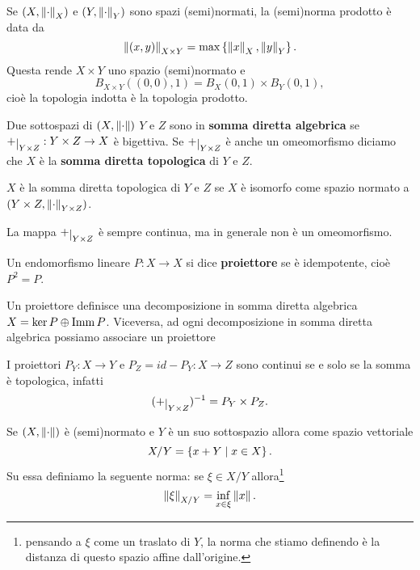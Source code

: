 \begin{definition}
    Se $(X,{\left\Vert{\cdot}\right\Vert}_X)$ e $(Y,{\left\Vert{\cdot}\right\Vert}_Y)$ sono spazi (semi)normati, la (semi)norma prodotto \`e data da
    \[\left\Vert{(x,y)}\right\Vert_{X\times Y}=\max\left\{{\left\Vert{x}\right\Vert_X,\left\Vert{y}\right\Vert_Y}\right\}.\]
    Questa rende $X\times Y$ uno spazio (semi)normato e
    \[B_{X\times Y}((0,0),1)=B_X(0,1)\times B_Y(0,1),\]
    cio\`e la topologia indotta \`e la topologia prodotto.
\end{definition}

\begin{definition}
Due sottospazi di $(X,{\left\Vert{\cdot}\right\Vert})$ $Y$ e $Z$ sono in \textbf{somma diretta algebrica} se $+\res{Y\times Z}:Y\times Z\to X$ \`e bigettiva. Se $+\res{Y\times Z}$ \`e anche un omeomorfismo diciamo che $X$ \`e la \textbf{somma diretta topologica} di $Y$ e $Z$.
\end{definition}

\begin{remark}
$X$ \`e la somma diretta topologica di $Y$ e $Z$ se $X$ \`e isomorfo come spazio normato a $(Y\times Z,{\left\Vert{\cdot}\right\Vert}_{Y\times Z})$.
\end{remark}

\begin{remark}
La mappa $+\res{Y\times Z}$ \`e sempre continua, ma in generale non \`e un omeomorfismo.
\end{remark}

\begin{definition}[Proiettore]
Un endomorfismo lineare $P:X\to X$ si dice \textbf{proiettore} se \`e idempotente, cio\`e $P^2=P$.
\end{definition}

\begin{remark}
Un proiettore definisce una decomposizione in somma diretta algebrica $X=\ker P\oplus \operatorname{Imm} P$. Viceversa, ad ogni decomposizione in somma diretta algebrica possiamo associare un proiettore
\end{remark}

\begin{remark}
I proiettori $P_Y:X\to Y$ e $P_Z=id-P_Y:X\to Z$ sono continui se e solo se la somma \`e topologica, infatti
\[(+\res{Y\times Z})\ii=P_Y\times P_Z.\]
\end{remark}

\begin{definition}
Se $(X,{\left\Vert{\cdot}\right\Vert})$ \`e (semi)normato e $Y$ \`e un suo sottospazio allora come spazio vettoriale
\[X/Y=\left\{{x+Y\mid x\in X}\right\}.\]
Su essa definiamo la seguente norma: se $\xi\in X/Y$ allora\footnote{pensando a $\xi$ come un traslato di $Y$, la norma che stiamo definendo \`e la distanza di questo spazio affine dall'origine.}
\[\left\Vert{\xi}\right\Vert_{X/Y}=\inf_{x\in\xi}\left\Vert{x}\right\Vert.\]
\end{definition}

